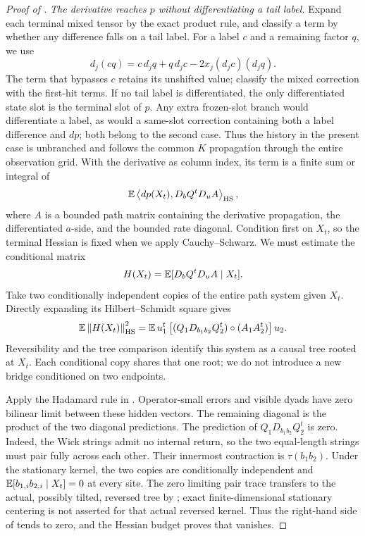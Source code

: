 \begin{proof}[Proof of ]
\emph{The derivative reaches $p$ without differentiating a tail
label.} Expand each terminal mixed tensor by the exact product rule,
and classify a term by whether any difference falls on a tail label.
For a label $c$ and a remaining factor $q$, we use
\[
 d_j(cq)=c\,d_jq+q\,d_jc-2x_j(d_jc)(d_jq).
\]
The term that bypasses $c$ retains its unshifted value; classify the
mixed correction with the first-hit terms. If no tail label is
differentiated, the only differentiated state slot is the terminal
slot of $p$. Any extra frozen-slot branch would differentiate a
label, as would a same-slot correction containing both a label
difference and $dp$; both belong to the second case. Thus the history
in the present case is unbranched and follows the common $K$
propagation through the entire observation grid. With the derivative as column index, its term is a
finite sum or integral of
\begin{equation}\label{eq:hidden-hessian-ending}
 \mathbb E\left\langle dp(X_t),D_bQ^tD_u A\right\rangle_{\mathrm{HS}},
\end{equation}
where $A$ is a bounded path matrix containing the derivative
propagation, the differentiated $a$-side, and the bounded rate
diagonal. Condition first on $X_t$, so the terminal Hessian is fixed when
we apply Cauchy--Schwarz. We must estimate the conditional matrix
\[
 H(X_t)=\mathbb E[D_bQ^tD_u A\mid X_t].
\]
Take two conditionally independent copies of the entire path system
given $X_t$. Directly expanding its Hilbert--Schmidt square gives
\begin{equation}\label{eq:hidden-hadamard-pair}
 \mathbb E\left\lVert H(X_t)\right\rVert_{\mathrm{HS}}^2
 =\mathbb E\,u_1^t\left[
       (Q_1D_{b_1b_2}Q_2^t)\circ(A_1A_2^t)
                    \right]u_2.
\end{equation}
Reversibility and the tree comparison identify this system as a causal
tree rooted at $X_t$. Each conditional copy shares that one root;
we do not introduce a new bridge conditioned on two endpoints.

Apply the Hadamard rule in . Operator-small
errors and visible dyads have zero bilinear limit between these
hidden vectors. The remaining diagonal is the product of the two
diagonal predictions. The prediction of
$Q_1D_{b_1b_2}Q_2^t$ is zero. Indeed, the Wick strings admit no internal
return, so the two equal-length strings must pair fully across each
other. Their innermost contraction is $\tau(b_1b_2)$. Under the
stationary kernel, the two copies are conditionally independent and
$\mathbb E[b_{1,i}b_{2,i}\mid X_t]=0$ at every site. The zero limiting pair
trace transfers to the actual, possibly tilted, reversed tree by
; exact finite-dimensional stationary
centering is not asserted for that actual reversed kernel. Thus the
right-hand side of  tends to zero, and
the Hessian budget proves that 
vanishes.


\end{proof}

